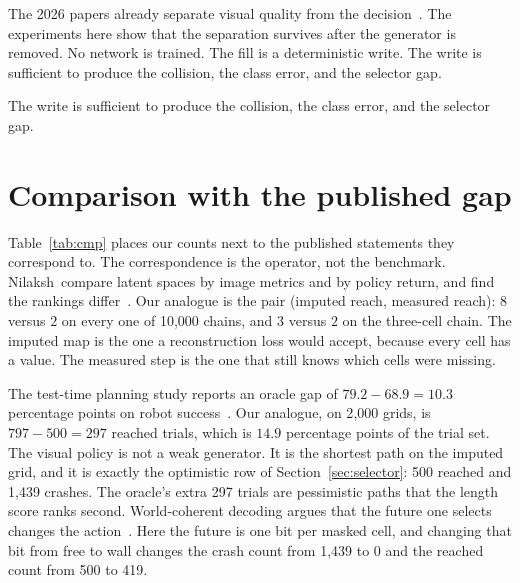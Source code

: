 \documentclass[10pt,twocolumn,letterpaper]{article}
\begin{document}
The 2026 papers already separate visual quality from the decision~\cite{nilaksh2026,visual2026}.
The experiments here show that the separation survives after the generator is removed.
No network is trained.
The fill is a deterministic write.
The write is sufficient to produce the collision, the class error, and the selector gap.

The write is sufficient to produce the collision, the class error, and the selector gap.

\section{Comparison with the published gap}

Table~\ref{tab:cmp} places our counts next to the published statements they correspond to.
The correspondence is the operator, not the benchmark.
Nilaksh~\etal compare latent spaces by image metrics and by policy return, and find the rankings differ~\cite{nilaksh2026}.
Our analogue is the pair (imputed reach, measured reach): $8$ versus $2$ on every one of 10{,}000 chains, and $3$ versus $2$ on the three-cell chain.
The imputed map is the one a reconstruction loss would accept, because every cell has a value.
The measured step is the one that still knows which cells were missing.

The test-time planning study reports an oracle gap of $79.2-68.9=10.3$ percentage points on robot success~\cite{visual2026}.
Our analogue, on 2{,}000 grids, is $797-500=297$ reached trials, which is $14.9$ percentage points of the trial set.
The visual policy is not a weak generator.
It is the shortest path on the imputed grid, and it is exactly the optimistic row of Section~\ref{sec:selector}: 500 reached and 1{,}439 crashes.
The oracle's extra 297 trials are pessimistic paths that the length score ranks second.
World-coherent decoding argues that the future one selects changes the action~\cite{wcd2026}.
Here the future is one bit per masked cell, and changing that bit from free to wall changes the crash count from 1{,}439 to $0$ and the reached count from 500 to 419.
\end{document}
